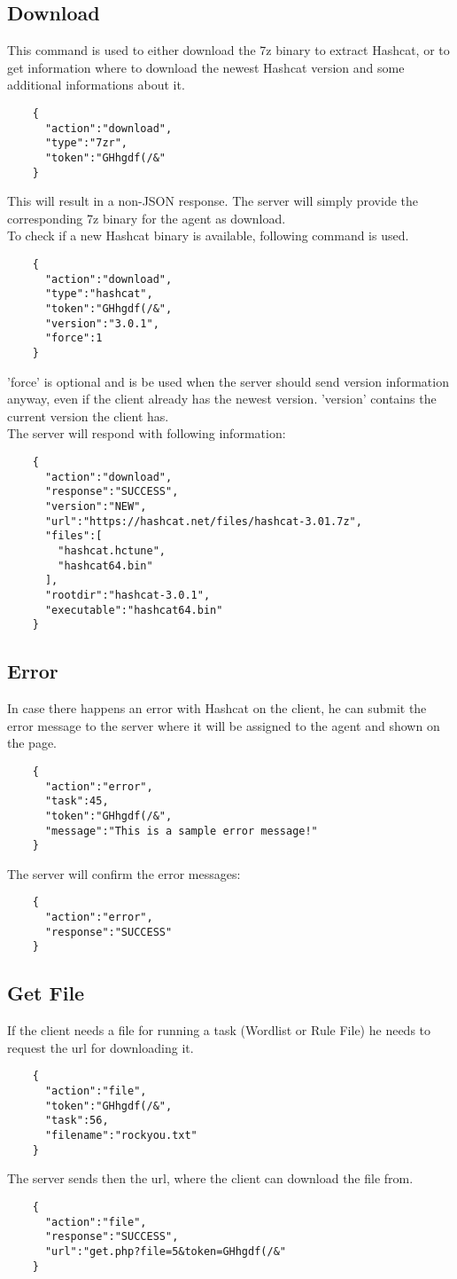 \documentclass{article}
\begin{document}
	\subsection*{Download}
	This command is used to either download the 7z binary to extract Hashcat, or to get information where to download the newest Hashcat version and some additional informations about it.
	\begin{verbatim}
	{
	  "action":"download",
	  "type":"7zr",
	  "token":"GHhgdf(/&"
	}
	\end{verbatim}
	This will result in a non-JSON response. The server will simply provide the corresponding 7z binary for the agent as download.\\
	To check if a new Hashcat binary is available, following command is used.
	\begin{verbatim}
	{
	  "action":"download",
	  "type":"hashcat",
	  "token":"GHhgdf(/&",
	  "version":"3.0.1",
	  "force":1
	}
	\end{verbatim}
	'force' is optional and is be used when the server should send version information anyway, even if the client already has the newest version. 'version' contains the current version the client has.\\
	The server will respond with following information:
	\begin{verbatim}
	{
	  "action":"download",
	  "response":"SUCCESS",
	  "version":"NEW",
	  "url":"https://hashcat.net/files/hashcat-3.01.7z",
	  "files":[
	    "hashcat.hctune",
	    "hashcat64.bin"
	  ],
	  "rootdir":"hashcat-3.0.1",
	  "executable":"hashcat64.bin"
	}
	\end{verbatim}
	
	\subsection*{Error}
	In case there happens an error with Hashcat on the client, he can submit the error message to the server where it will be assigned to the agent and shown on the page.
	\begin{verbatim}
	{
	  "action":"error",
	  "task":45,
	  "token":"GHhgdf(/&",
	  "message":"This is a sample error message!"
	}
	\end{verbatim}
	The server will confirm the error messages:
	\begin{verbatim}
	{
	  "action":"error",
	  "response":"SUCCESS"
	}
	\end{verbatim}
	
	\subsection*{Get File}
	If the client needs a file for running a task (Wordlist or Rule File) he needs to request the url for downloading it.
	\begin{verbatim}
	{
	  "action":"file",
	  "token":"GHhgdf(/&",
	  "task":56,
	  "filename":"rockyou.txt"
	}
	\end{verbatim}
	The server sends then the url, where the client can download the file from.
	\begin{verbatim}
	{
	  "action":"file",
	  "response":"SUCCESS",
	  "url":"get.php?file=5&token=GHhgdf(/&"
	}
	\end{verbatim}
	
\end{document}
